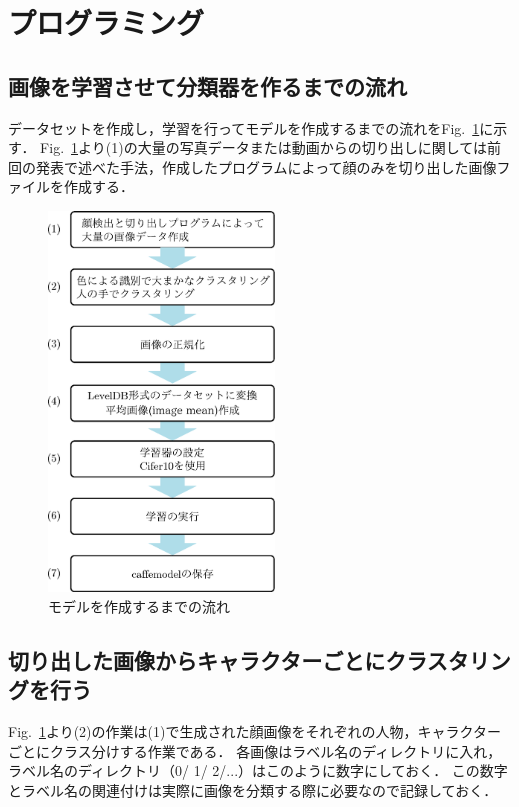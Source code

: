 \documentclass[a4paper,10pt]{jsarticle}
\begin{document}

\section{プログラミング}
\subsection{画像を学習させて分類器を作るまでの流れ}
データセットを作成し，学習を行ってモデルを作成するまでの流れをFig.~\ref{fig:モデルを作成するまでの流れ}に示す．
Fig.~\ref{fig:モデルを作成するまでの流れ}より(1)の大量の写真データまたは動画からの切り出しに関しては前回の発表で述べた手法，作成したプログラムによって顔のみを切り出した画像ファイルを作成する．
\begin{figure}[tb]
  \begin{center}
    \includegraphics[clip,width=6cm]{fig/eps/learning_flow.eps}
  \end{center}
  \caption{モデルを作成するまでの流れ}
  \label{fig:モデルを作成するまでの流れ}
\end{figure}

\subsection{切り出した画像からキャラクターごとにクラスタリングを行う}
Fig.~\ref{fig:モデルを作成するまでの流れ}より(2)の作業は(1)で生成された顔画像をそれぞれの人物，キャラクターごとにクラス分けする作業である．
各画像はラベル名のディレクトリに入れ，ラベル名のディレクトリ（0/ 1/ 2/...）はこのように数字にしておく．
この数字とラベル名の関連付けは実際に画像を分類する際に必要なので記録しておく．
\end{document}
